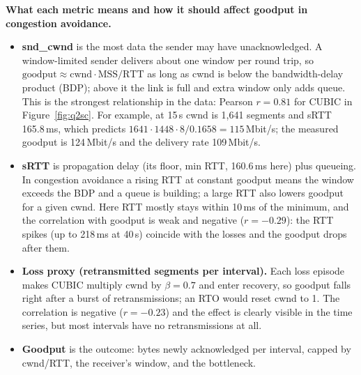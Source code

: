 \documentclass[10pt]{article}
\begin{document}
\textbf{What each metric means and how it should affect goodput in congestion avoidance.}
\begin{itemize}
\item \textbf{snd\_cwnd} is the most data the sender may have unacknowledged. A window-limited sender delivers about one window per round trip, so $\text{goodput} \approx \text{cwnd}\cdot\text{MSS}/\text{RTT}$ as long as cwnd is below the bandwidth-delay product (BDP); above it the link is full and extra window only adds queue. This is the strongest relationship in the data: Pearson $r = 0.81$ for CUBIC in Figure~\ref{fig:q2sc}. For example, at 15\,s cwnd is 1,641 segments and sRTT 165.8\,ms, which predicts $1641\cdot1448\cdot8/0.1658 = 115$\,Mbit/s; the measured goodput is 124\,Mbit/s and the delivery rate 109\,Mbit/s.
\item \textbf{sRTT} is propagation delay (its floor, min RTT, 160.6\,ms here) plus queueing. In congestion avoidance a rising RTT at constant goodput means the window exceeds the BDP and a queue is building; a large RTT also lowers goodput for a given cwnd. Here RTT mostly stays within 10\,ms of the minimum, and the correlation with goodput is weak and negative ($r = -0.29$): the RTT spikes (up to 218\,ms at 40\,s) coincide with the losses and the goodput drops after them.
\item \textbf{Loss proxy (retransmitted segments per interval).} Each loss episode makes CUBIC multiply cwnd by $\beta = 0.7$ and enter recovery, so goodput falls right after a burst of retransmissions; an RTO would reset cwnd to 1. The correlation is negative ($r = -0.23$) and the effect is clearly visible in the time series, but most intervals have no retransmissions at all.
\item \textbf{Goodput} is the outcome: bytes newly acknowledged per interval, capped by cwnd/RTT, the receiver's window, and the bottleneck.
\end{itemize}
\end{document}
